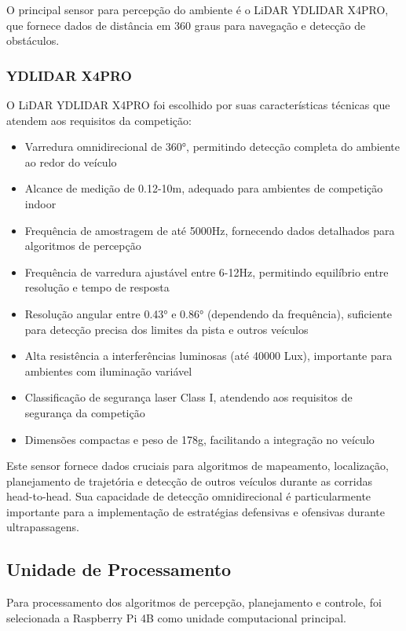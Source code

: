 O principal sensor para percepção do ambiente é o LiDAR YDLIDAR X4PRO, que
fornece dados de distância em 360 graus para navegação e detecção de
obstáculos.

\subsubsection{YDLIDAR X4PRO}

O LiDAR YDLIDAR X4PRO foi escolhido por suas características técnicas que
atendem aos requisitos da competição:

\begin{itemize}
    \item Varredura omnidirecional de 360°, permitindo detecção completa do ambiente ao
          redor do veículo
    \item Alcance de medição de 0.12-10m, adequado para ambientes de competição indoor
    \item Frequência de amostragem de até 5000Hz, fornecendo dados detalhados para
          algoritmos de percepção
    \item Frequência de varredura ajustável entre 6-12Hz, permitindo equilíbrio entre
          resolução e tempo de resposta
    \item Resolução angular entre 0.43° e 0.86° (dependendo da frequência), suficiente
          para detecção precisa dos limites da pista e outros veículos
    \item Alta resistência a interferências luminosas (até 40000 Lux), importante para
          ambientes com iluminação variável
    \item Classificação de segurança laser Class I, atendendo aos requisitos de segurança
          da competição
    \item Dimensões compactas e peso de 178g, facilitando a integração no veículo
\end{itemize}

Este sensor fornece dados cruciais para algoritmos de mapeamento, localização,
planejamento de trajetória e detecção de outros veículos durante as corridas
head-to-head. Sua capacidade de detecção omnidirecional é particularmente
importante para a implementação de estratégias defensivas e ofensivas durante
ultrapassagens.

\subsection{Unidade de Processamento}

Para processamento dos algoritmos de percepção, planejamento e controle, foi
selecionada a Raspberry Pi 4B como unidade computacional principal.

